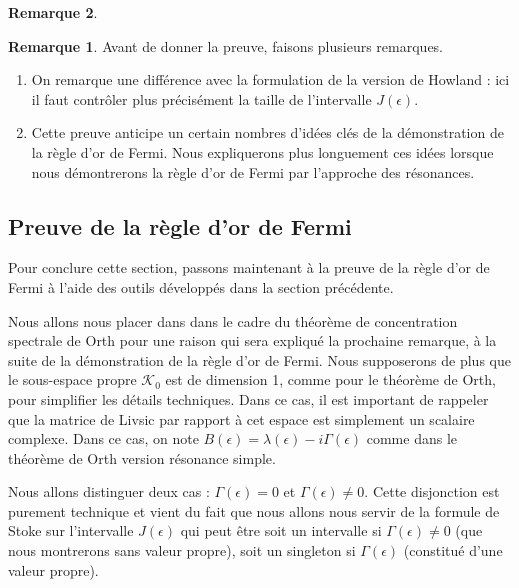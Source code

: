 \documentclass[12pt,openany,a4paper, titlepage]{article}
\theoremstyle{definition}
\theoremstyle{definition}
\theoremstyle{definition}
\theoremstyle{definition}
\theoremstyle{definition}
\newtheorem{rem}{Remarque}
\theoremstyle{definition}
\begin{document}
\begin{rem}
\begin{rem}
    Avant de donner la preuve, faisons plusieurs remarques.
    \begin{enumerate}
        \item On remarque une différence avec la formulation de la version de Howland : ici il faut contrôler plus précisément la taille de l'intervalle $J(\epsilon)$.
        \item Cette preuve anticipe un certain nombres d'idées clés de la démonstration de la règle d'or de Fermi. Nous expliquerons plus longuement ces idées lorsque nous démontrerons la règle d'or de Fermi par l'approche des résonances.
    \end{enumerate}
\end{rem}

\subsection{Preuve de la règle d'or de Fermi}

Pour conclure cette section, passons maintenant à la preuve de la règle d'or de Fermi à l'aide des outils développés dans la section précédente.

Nous allons nous placer dans dans le cadre du théorème de concentration spectrale de Orth pour une raison qui sera expliqué la prochaine remarque, à la suite de la démonstration de la règle d'or de Fermi. Nous supposerons de plus que le sous-espace propre $\mathcal{K}_0$ est de dimension 1, comme pour le théorème de Orth, pour simplifier les détails techniques. Dans ce cas, il est important de rappeler que la matrice de Livsic par rapport à cet espace est simplement un scalaire complexe. Dans ce cas, on note $B(\epsilon) = \lambda(\epsilon) - i\Gamma(\epsilon)$ comme dans le théorème de Orth version résonance simple.

Nous allons distinguer deux cas : $\Gamma(\epsilon) = 0$ et $\Gamma(\epsilon) \neq 0$. Cette disjonction est purement technique et vient du fait que nous allons nous servir de la formule de Stoke sur l'intervalle $J(\epsilon)$ qui peut être soit un intervalle si $\Gamma(\epsilon) \neq 0$ (que nous montrerons sans valeur propre), soit un singleton si $\Gamma(\epsilon)$ (constitué d'une valeur propre).




\end{rem}
\end{document}
